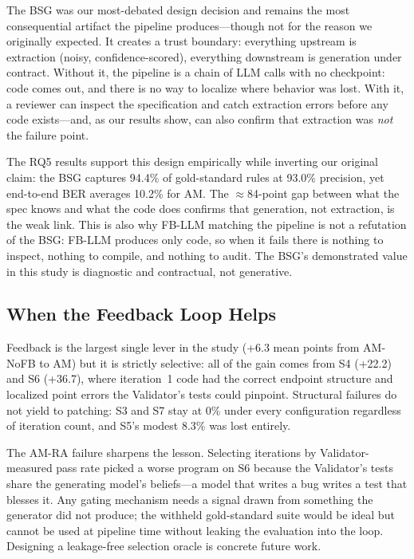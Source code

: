 \documentclass[conference]{IEEEtran}
\begin{document}
The BSG was our most-debated design decision and remains the most consequential artifact the pipeline produces---though not for the reason we originally expected. It creates a trust boundary: everything upstream is extraction (noisy, confidence-scored), everything downstream is generation under contract. Without it, the pipeline is a chain of LLM calls with no checkpoint: code comes out, and there is no way to localize where behavior was lost. With it, a reviewer can inspect the specification and catch extraction errors before any code exists---and, as our results show, can also confirm that extraction was \emph{not} the failure point.

The RQ5 results support this design empirically while inverting our original claim: the BSG captures 94.4\% of gold-standard rules at 93.0\% precision, yet end-to-end BER averages 10.2\% for AM. The $\approx$84-point gap between what the spec knows and what the code does confirms that generation, not extraction, is the weak link. This is also why FB-LLM matching the pipeline is not a refutation of the BSG: FB-LLM produces only code, so when it fails there is nothing to inspect, nothing to compile, and nothing to audit. The BSG's demonstrated value in this study is diagnostic and contractual, not generative.

\subsection{When the Feedback Loop Helps}
\label{sec:feedback-decisive}

Feedback is the largest single lever in the study (+6.3 mean points from AM-NoFB to AM) but it is strictly selective: all of the gain comes from S4 (+22.2) and S6 (+36.7), where iteration~1 code had the correct endpoint structure and localized point errors the Validator's tests could pinpoint. Structural failures do not yield to patching: S3 and S7 stay at 0\% under every configuration regardless of iteration count, and S5's modest 8.3\% was lost entirely.

The AM-RA failure sharpens the lesson. Selecting iterations by Validator-measured pass rate picked a worse program on S6 because the Validator's tests share the generating model's beliefs---a model that writes a bug writes a test that blesses it. Any gating mechanism needs a signal drawn from something the generator did not produce; the withheld gold-standard suite would be ideal but cannot be used at pipeline time without leaking the evaluation into the loop. Designing a leakage-free selection oracle is concrete future work.
\end{document}
